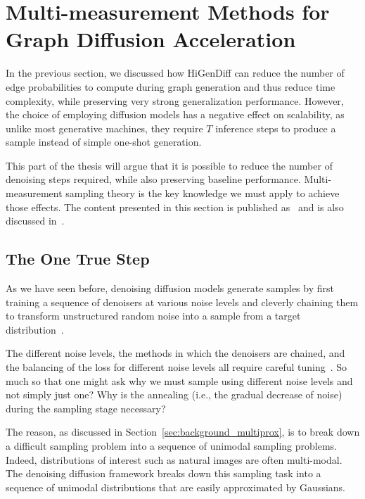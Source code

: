 \section{Multi-measurement Methods for Graph Diffusion Acceleration}
\label{sec: multiprox}

In the previous section, we discussed how HiGenDiff can reduce the number of edge probabilities to compute during graph generation and thus reduce time complexity, while preserving very strong generalization performance. However, the choice of employing diffusion models has a negative effect on scalability, as unlike most generative machines, they require $T$ inference steps to produce a sample instead of simple one-shot generation.

This part of the thesis will argue that it is possible to reduce the number of denoising steps required, while also preserving baseline performance. Multi-measurement sampling theory is the key knowledge we must apply to achieve those effects. The content presented in this section is published as~\cite{dadi_improving_2025} and is also discussed in~\cite{dadi_noisy_2025}.

\subsection{The One True Step}

As we have seen before, denoising diffusion models generate samples by first training a sequence of denoisers at various noise levels and cleverly chaining them to transform unstructured random noise into a sample from a target distribution~\cite{ho_denoising_2020, dhariwal_diffusion_2021}. 

The different noise levels, the methods in which the denoisers are chained, and the balancing of the loss for different noise levels all require careful tuning~\cite{karras_elucidating_2022}. So much so that one might ask why we must sample using different noise levels and not simply just one? Why is the annealing (i.e., the gradual decrease of noise) during the sampling stage necessary? 

The reason, as discussed in Section~\ref{sec:background_multiprox}, is to break down a difficult sampling problem into a sequence of unimodal sampling problems. Indeed, distributions of interest such as natural images are often multi-modal. The denoising diffusion framework breaks down this sampling task into a sequence of unimodal distributions that are easily approximated by Gaussians. 

